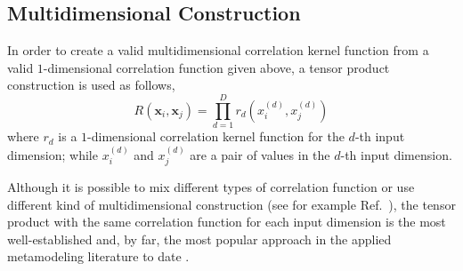 \subsection{Multidimensional Construction}\label{sub:gp_multidimension}

In order to create a valid multidimensional correlation kernel function from a valid $1$-dimensional correlation function given above, 
a tensor product construction is used as follows,
\begin{equation}
	R(\bm{x}_i, \bm{x}_j) = \prod_{d = 1}^{D} r_d \left(x_i^{(d)}, x_j^{(d)}\right)
\label{eq:tensor_product}
\end{equation}
where $r_d$ is a $1$-dimensional correlation kernel function for the $d$-th input dimension;
while $x_i^{(d)}$ and $x_j^{(d)}$ are a pair of values in the $d$-th input dimension.

Although it is possible to mix different types of correlation function or use different kind of multidimensional construction (see for example Ref.~\cite{Higdon2002}),
the tensor product with the same correlation function for each input dimension is the most well-established 
and, by far, the most popular approach in the applied metamodeling literature to date \cite{Roustant2012,Sacks1989,Sacks1989a,Santner2003,Currin1991,Marrel2008,Bachoc2014,Kennedy2006,Jones2009}.

